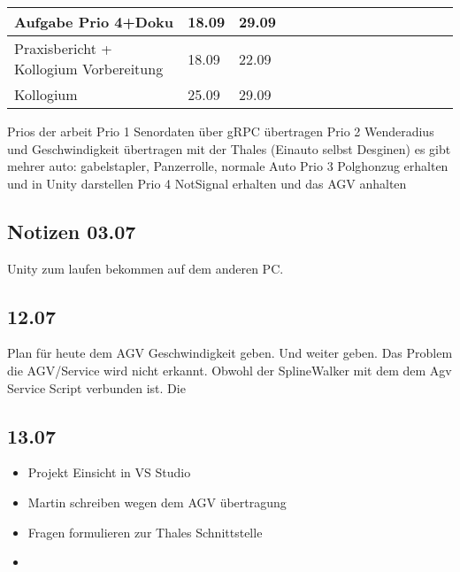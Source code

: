 \begin{landscape}
\begin{tabularx}{21cm}{|l|l|l|X|X|X|X|X|X|X|X|X|X|X|X|}
    Aufgabe Prio 4+Doku                    & 18.09           & 29.09         &                          &                          &                          &                          &                          &                          &                          &                          &                          & \cellcolor[HTML]{68CBD0} & \cellcolor[HTML]{68CBD0} & \cellcolor[HTML]{68CBD0} \\ \hline
    Praxisbericht + Kollogium Vorbereitung & 18.09           & 22.09         &                          &                          &                          &                          &                          &                          &                          &                          &                          &                          & \cellcolor[HTML]{34FF34} &                          \\ \hline
    Kollogium                              & 25.09           & 29.09         &                          &                          &                          &                          &                          &                          &                          &                          &                          &                          &                          & \cellcolor[HTML]{FE0000} \\ \hline
\end{tabularx}
\end{landscape}


Prios der arbeit
Prio 1 Senordaten über gRPC übertragen
Prio 2 Wenderadius und Geschwindigkeit übertragen mit der Thales (Einauto selbst Desginen)
es gibt mehrer auto: gabelstapler, Panzerrolle, normale Auto
Prio 3 Polghonzug erhalten und in Unity darstellen
Prio 4 NotSignal erhalten und das AGV anhalten 

\subsection{Notizen 03.07}
Unity zum laufen bekommen auf dem anderen PC.

\subsection{12.07}
Plan für heute dem AGV Geschwindigkeit geben. Und weiter geben. Das Problem die AGV/Service wird nicht erkannt. Obwohl der SplineWalker mit dem dem Agv Service Script verbunden ist. Die 

\subsection{13.07}
\begin{itemize}
\item Projekt Einsicht in VS Studio
\item Martin schreiben wegen dem AGV übertragung
\item Fragen formulieren zur Thales Schnittstelle
\item 
\end{itemize}

